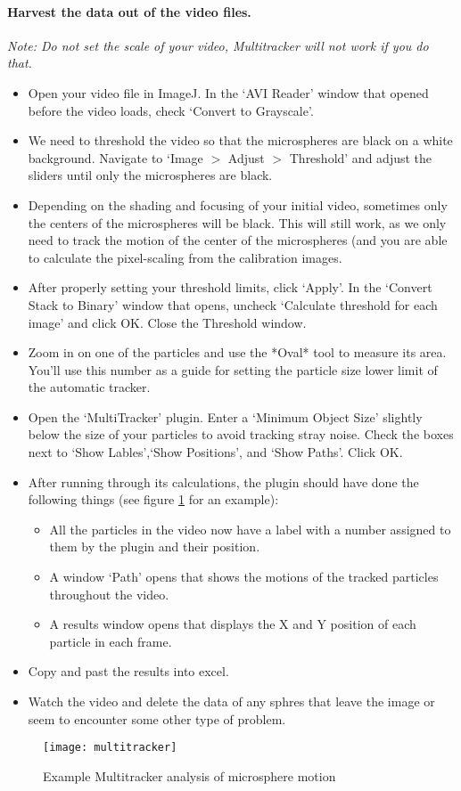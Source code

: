 \paragraph*{Harvest the data out of the video files.}
\emph{Note: Do not set the scale of your video, Multitracker will not work if you do that.}
\begin{itemize}
\item Open your video file in ImageJ. In the `AVI Reader' window that opened before the video loads, check `Convert to Grayscale'.
\item We need to threshold the video so that the microspheres are black on a white background. Navigate to `Image $>$ Adjust $>$ Threshold' and adjust the sliders until only the microspheres are black.
\item Depending on the shading and focusing of your initial video, sometimes only the centers of the microspheres will be black. This will still work, as we only need to track the motion of the center of the microspheres (and you are able to calculate the pixel-scaling from the calibration images.
\item After properly setting your threshold limits, click `Apply'. In the `Convert Stack to Binary' window that opens, uncheck `Calculate threshold for each image' and click OK. Close the Threshold window.
\item Zoom in on one of the particles and use the *Oval* tool to measure its area. You'll use this number as a guide for setting the particle size lower limit of the automatic tracker.
\item Open the `MultiTracker' plugin. Enter a `Minimum Object Size' slightly below the size of your particles to avoid tracking stray noise. Check the boxes next to `Show Lables',`Show Positions', and `Show Paths'. Click OK.
\item After running through its calculations, the plugin should have done the following things (see figure \ref{fig:multitracker} for an example):
\begin{itemize}
	\item All the particles in the video now have a label with a number assigned to them by the plugin and their position.
	\item A window `Path' opens that shows the motions of the tracked particles throughout the video.
	\item A results window opens that displays the X and Y position of each particle in each frame.
\end{itemize}
\item Copy and past the results into excel.
\item Watch the video and delete the data of any sphres that leave the image or seem to encounter some other type of problem.
\end{itemize}
\begin{figure}[ht]
	\centering
	\texttt{[image: multitracker]}
	\caption{Example Multitracker analysis of microsphere motion}
	\label{fig:multitracker}
\end{figure}

